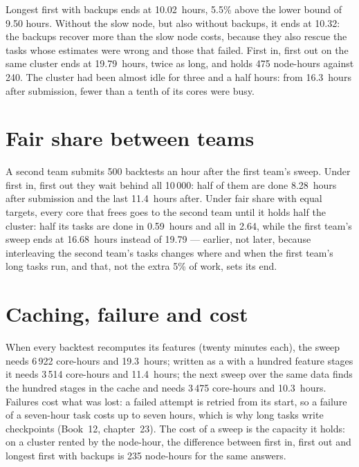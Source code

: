 \label{lst:pl:distributed-compute-and-schedulers:spec}

\begin{example}\label{ex:pl:distributed-compute-and-schedulers:sweep}
Longest first with backups ends at 10.02~hours, 5.5\% above the lower bound of 9.50 hours. Without the slow node, but also without
backups, it ends at 10.32: the backups recover more than the slow node costs, because they also rescue the tasks whose estimates were
wrong and those that failed. First in, first out on the same cluster ends at 19.79~hours, twice as long, and holds 475 node-hours against
240. The cluster had been almost idle for three and a half hours: from 16.3~hours after submission, fewer than a tenth of its cores were
busy.
\end{example}

\section{Fair share between teams}

A second team submits 500 backtests an hour after the first team's sweep. Under first in, first out they wait behind all 10\,000: half of them
are done 8.28~hours after submission and the last 11.4~hours after. Under fair share with equal targets, every core that frees goes to the
second team until it holds half the cluster: half its tasks are done in 0.59~hours and all in 2.64, while the first team's sweep ends at
16.68~hours instead of 19.79 --- earlier, not later, because interleaving the second team's tasks changes where and when the first
team's long tasks run, and that, not the extra 5\% of work, sets its end.

\section{Caching, failure and cost}

When every backtest recomputes its features (twenty minutes each), the sweep needs 6\,922 core-hours and 19.3~hours; written as a 
with a hundred feature stages it needs 3\,514 core-hours and 11.4~hours; the next sweep over the same data finds the hundred stages in the
cache and needs 3\,475 core-hours and 10.3~hours. Failures cost what was lost: a failed attempt is retried from its start, so a failure of a
seven-hour task costs up to seven hours, which is why long tasks write checkpoints (Book~12, chapter~23). The cost of a sweep is the capacity
it holds: on a cluster rented by the node-hour, the difference between first in, first out and longest first with backups is 235 node-hours for
the same answers.

